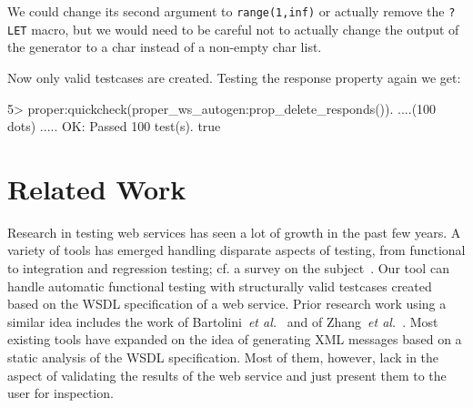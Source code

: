 \documentclass[submission,copyright]{eptcs}
\newcommand{\LET}{\texttt{?LET}\xspace}
\begin{document}
We could change its second argument to \texttt{range(1,inf)} or
actually remove the \LET macro, but we would need to be careful not to
actually change the output of the generator to a char instead of a
non-empty char list.

Now only valid testcases are created. Testing the response property again we 
get:
\vfill\eject
\begin{lstoutput}
5> proper:quickcheck(proper_ws_autogen:prop_delete_responds()).
....(100 dots) .....
OK: Passed 100 test(s).
true
\end{lstoutput}


\section{Related Work} \label{sec:related}

Research in testing web services has seen a lot of growth in the past
few years. A variety of tools has emerged handling disparate aspects
of testing, from functional to integration and regression testing; cf.
a survey on the subject~\cite{SOATesting@springerlink-09}. Our tool
can handle automatic functional testing with structurally valid
testcases created based on the WSDL specification of a web service.
Prior research work using a similar idea includes the work of
Bartolini~\textit{et al.}~\cite{bartolini@ICSOC-08} and of
Zhang~\textit{et al.}~\cite{zhang@IC-08}. Most existing tools have
expanded on the idea of generating XML messages based on a static
analysis of the WSDL specification. Most of them, however, lack in the
aspect of validating the results of the web service and just present
them to the user for inspection.
\end{document}
